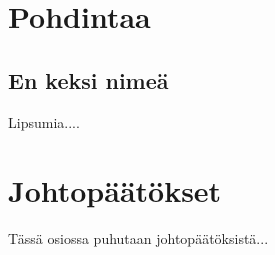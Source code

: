 \section{Pohdintaa}

\subsection{En keksi nimeä}

Lipsumia....

\section{Johtopäätökset}

Tässä osiossa puhutaan johtopäätöksistä...
